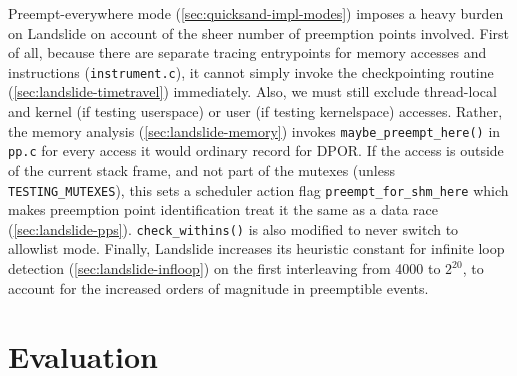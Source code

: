 Preempt-everywhere mode (\cref{sec:quicksand-impl-modes})
imposes a heavy burden on Landslide on account of the sheer number of preemption points involved.
First of all, because there are separate tracing entrypoints for memory accesses and instructions ({\tt instrument.c}),
it cannot simply invoke the checkpointing routine (\cref{sec:landslide-timetravel}) immediately.
Also, we must still exclude thread-local and kernel (if testing userspace) or user (if testing kernelspace) accesses.
Rather,
the memory analysis (\cref{sec:landslide-memory}) invokes
{\tt maybe\_preempt\_here()} in {\tt pp.c}
for every access it would ordinary record for DPOR.
If the access is outside of the current stack frame,
and not part of the mutexes (unless {\tt TESTING\_MUTEXES}),
this sets a scheduler action flag {\tt preempt\_for\_shm\_here}
which makes preemption point identification treat it the same as a data race (\cref{sec:landslide-pps}).
{\tt check\_withins()} is also modified to never switch to allowlist mode.
Finally,
Landslide increases its heuristic constant for infinite loop detection (\cref{sec:landslide-infloop})
on the first interleaving from 4000 to $2^{20}$,
to account for the increased orders of magnitude in preemptible events.


\section{Evaluation}
\label{sec:quicksand-eval}



